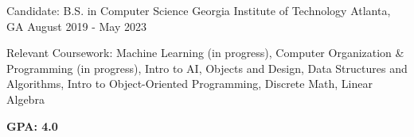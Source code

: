 


\begin{cventries}

\cventry
{Candidate: B.S. in Computer Science}
{Georgia Institute of Technology}
{Atlanta, GA}
{August 2019 - May 2023}
{\begin{cvitems}
\item {Relevant Coursework: Machine Learning (in progress), Computer Organization \& Programming (in progress), Intro to AI, Objects and Design, Data Structures and Algorithms, Intro to Object-Oriented Programming, Discrete Math, Linear Algebra}
\item \textbf{GPA: 4.0}
\end{cvitems}
}


\end{cventries}
